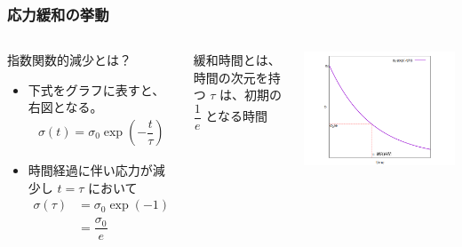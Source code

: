 \documentclass[unicode,12pt]{beamer}%
\begin{document}
\begin{frame}
	\frametitle{応力緩和の挙動}
		\begin{columns}[T, onlytextwidth]
				\begin{exampleblock}{指数関数的減少とは？}
					\begin{itemize}
						\item 下式をグラフに表すと、右図となる。
						\begin{align*}
							\sigma(t) = \sigma_0 \exp \left(-\dfrac{t}{\tau} \right)
						\end{align*}
						\item 時間経過に伴い応力が減少し $t = \tau$ において
						\begin{align*}
							\sigma(\tau) 
							&= \sigma_0 \exp(-1)\\ 
							&= \dfrac{\sigma_0}{e}
						\end{align*}
					\end{itemize}
				\end{exampleblock}
				\begin{alertblock}{緩和時間とは、}
					時間の次元を持つ $\tau$ は、初期の $\dfrac{1}{e}$ となる時間
				\end{alertblock}
				\begin{center}
					\includegraphics[width=\textwidth]{relux_3.png}
				\end{center}
		\end{columns}
\end{frame}
\end{document}
